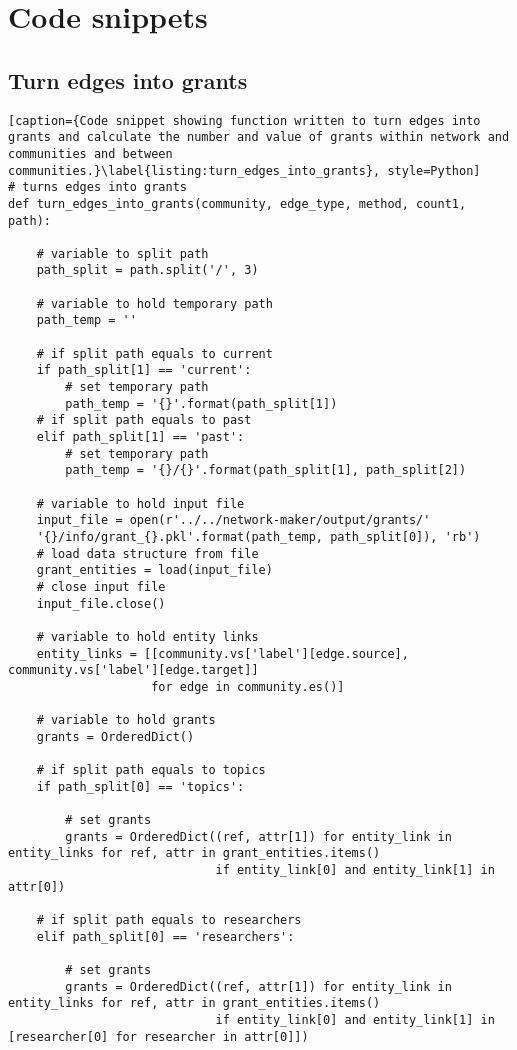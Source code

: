 \section{Code snippets}

\subsection{Turn edges into grants}

\begin{lstlisting}[caption={Code snippet showing function written to turn edges into grants and calculate the number and value of grants within network and communities and between communities.}\label{listing:turn_edges_into_grants}, style=Python]
# turns edges into grants
def turn_edges_into_grants(community, edge_type, method, count1, path):

    # variable to split path
    path_split = path.split('/', 3)

    # variable to hold temporary path
    path_temp = ''

    # if split path equals to current
    if path_split[1] == 'current':
        # set temporary path
        path_temp = '{}'.format(path_split[1])
    # if split path equals to past
    elif path_split[1] == 'past':
        # set temporary path
        path_temp = '{}/{}'.format(path_split[1], path_split[2])

    # variable to hold input file
    input_file = open(r'../../network-maker/output/grants/'
    '{}/info/grant_{}.pkl'.format(path_temp, path_split[0]), 'rb')
    # load data structure from file
    grant_entities = load(input_file)
    # close input file
    input_file.close()

    # variable to hold entity links
    entity_links = [[community.vs['label'][edge.source], community.vs['label'][edge.target]]
                    for edge in community.es()]

    # variable to hold grants
    grants = OrderedDict()

    # if split path equals to topics
    if path_split[0] == 'topics':

        # set grants
        grants = OrderedDict((ref, attr[1]) for entity_link in entity_links for ref, attr in grant_entities.items()
                             if entity_link[0] and entity_link[1] in attr[0])

    # if split path equals to researchers
    elif path_split[0] == 'researchers':

        # set grants
        grants = OrderedDict((ref, attr[1]) for entity_link in entity_links for ref, attr in grant_entities.items()
                             if entity_link[0] and entity_link[1] in [researcher[0] for researcher in attr[0]])


\end{lstlisting}
